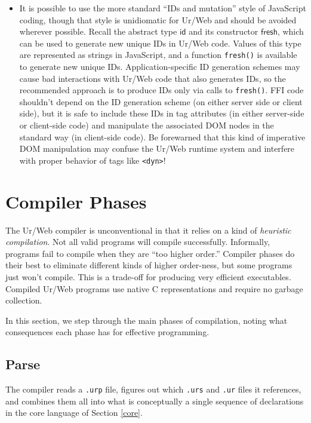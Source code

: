 \documentclass{article}
\newcommand{\cd}[1]{\texttt{#1}}
\newcommand{\mt}[1]{\mathsf{#1}}
\begin{document}
\begin{itemize}
\item It is possible to use the more standard ``IDs and mutation'' style of JavaScript coding, though that style is unidiomatic for Ur/Web and should be avoided wherever possible.  Recall the abstract type $\mt{id}$ and its constructor $\mt{fresh}$, which can be used to generate new unique IDs in Ur/Web code.  Values of this type are represented as strings in JavaScript, and a function \cd{fresh()} is available to generate new unique IDs.  Application-specific ID generation schemes may cause bad interactions with Ur/Web code that also generates IDs, so the recommended approach is to produce IDs only via calls to \cd{fresh()}.  FFI code shouldn't depend on the ID generation scheme (on either server side or client side), but it is safe to include these IDs in tag attributes (in either server-side or client-side code) and manipulate the associated DOM nodes in the standard way (in client-side code).  Be forewarned that this kind of imperative DOM manipulation may confuse the Ur/Web runtime system and interfere with proper behavior of tags like \cd{<dyn>}!
\end{itemize}


\section{Compiler Phases}

The Ur/Web compiler is unconventional in that it relies on a kind of \emph{heuristic compilation}.  Not all valid programs will compile successfully.  Informally, programs fail to compile when they are ``too higher order.''  Compiler phases do their best to eliminate different kinds of higher order-ness, but some programs just won't compile.  This is a trade-off for producing very efficient executables.  Compiled Ur/Web programs use native C representations and require no garbage collection.

In this section, we step through the main phases of compilation, noting what consequences each phase has for effective programming.

\subsection{Parse}

The compiler reads a \texttt{.urp} file, figures out which \texttt{.urs} and \texttt{.ur} files it references, and combines them all into what is conceptually a single sequence of declarations in the core language of Section \ref{core}.
\end{document}
